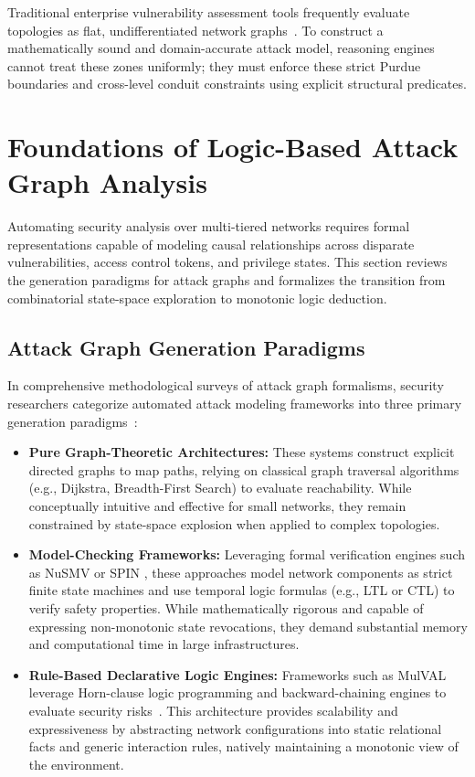 \documentclass[target=mst,aauheader=aics,style=]{thud}
\begin{document}
Traditional enterprise vulnerability assessment tools frequently evaluate topologies as flat, undifferentiated network graphs~\cite{Ou05}. To construct a mathematically sound and domain-accurate attack model, reasoning engines cannot treat these zones uniformly; they must enforce these strict Purdue boundaries and cross-level conduit constraints using explicit structural predicates.

\section{Foundations of Logic-Based Attack Graph Analysis}
\label{sec:logic_foundations}

Automating security analysis over multi-tiered networks requires formal representations capable of modeling causal relationships across disparate vulnerabilities, access control tokens, and privilege states. This section reviews the generation paradigms for attack graphs and formalizes the transition from combinatorial state-space exploration to monotonic logic deduction.

\subsection{Attack Graph Generation Paradigms}
\label{sec:ag_paradigms}
In comprehensive methodological surveys of attack graph formalisms, security researchers categorize automated attack modeling frameworks into three primary generation paradigms~\cite{KonstaSurvey, WachterSurvey}:

\begin{itemize}
    \item \textbf{Pure Graph-Theoretic Architectures:} These systems construct explicit directed graphs to map paths, relying on classical graph traversal algorithms (e.g., Dijkstra, Breadth-First Search)\cite{KonstaSurvey} to evaluate reachability. While conceptually intuitive and effective for small networks, they remain constrained by state-space explosion when applied to complex topologies.
    \item \textbf{Model-Checking Frameworks:} Leveraging formal verification engines such as NuSMV\cite{cimatti2002nusmv} or SPIN \cite{holzmann1997model}, these approaches model network components as strict finite state machines and use temporal logic formulas (e.g., LTL or CTL) to verify safety properties. While mathematically rigorous and capable of expressing non-monotonic state revocations, they demand substantial memory and computational time in large infrastructures.
    \item \textbf{Rule-Based Declarative Logic Engines:} Frameworks such as MulVAL leverage Horn-clause logic programming and backward-chaining engines to evaluate security risks~\cite{Ou05}. This architecture provides scalability and expressiveness by abstracting network configurations into static relational facts and generic interaction rules, natively maintaining a monotonic view of the environment.
\end{itemize}
\end{document}
